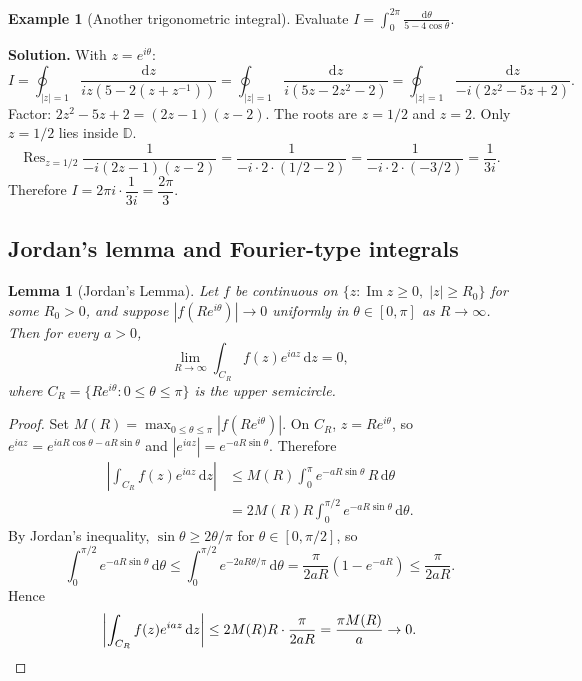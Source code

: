\documentclass[12pt,a4paper,openany]{book}
\theoremstyle{definition}
\newtheorem{example}[definition]{Example}
\theoremstyle{plain}
\newtheorem{lemma}[definition]{Lemma}
\theoremstyle{remark}
\newcommand{\D}{\mathbb{D}}
\DeclareMathOperator{\im}{Im}
\DeclareMathOperator{\Res}{Res}
\newcommand{\dd}{\mathrm{d}}
\newcommand{\abs}[1]{\left|#1\right|}
\begin{document}
\begin{example}[Another trigonometric integral]\label{ex:trig-2}
Evaluate $\displaystyle I=\int_0^{2\pi}\frac{\dd\theta}{5-4\cos\theta}$.

\medskip\noindent\textbf{Solution.}
With $z=e^{i\theta}$:
\[
  I=\oint_{\abs{z}=1}\frac{\dd z}{iz(5-2(z+z^{-1}))}
  =\oint_{\abs{z}=1}\frac{\dd z}{i(5z-2z^2-2)}
  =\oint_{\abs{z}=1}\frac{\dd z}{-i(2z^2-5z+2)}.
\]
Factor: $2z^2-5z+2=(2z-1)(z-2)$.  The roots are $z=1/2$ and $z=2$.
Only $z=1/2$ lies inside $\D$.
\[
  \Res_{z=1/2}\frac{1}{-i(2z-1)(z-2)}
  =\frac{1}{-i\cdot 2\cdot(1/2-2)}
  =\frac{1}{-i\cdot 2\cdot(-3/2)}
  =\frac{1}{3i}.
\]
Therefore $I=2\pi i\cdot\dfrac{1}{3i}=\dfrac{2\pi}{3}$.
\end{example}

\subsection{Jordan's lemma and Fourier-type integrals}
\label{ssec:jordan}

\begin{lemma}[Jordan's Lemma]\label{lem:jordan}
Let $f$ be continuous on $\{z:\im z\geq 0,\;\abs{z}\geq R_0\}$ for some
$R_0>0$, and suppose $\abs{f(Re^{i\theta})}\to 0$ uniformly in
$\theta\in[0,\pi]$ as $R\to\infty$.  Then for every $a>0$,
\[
  \lim_{R\to\infty}\int_{C_R}f(z)e^{iaz}\,\dd z=0,
\]
where $C_R=\{Re^{i\theta}:0\leq\theta\leq\pi\}$ is the upper semicircle.
\end{lemma}

\begin{proof}
Set $M(R)=\max_{0\leq\theta\leq\pi}\abs{f(Re^{i\theta})}$.  On $C_R$,
$z=Re^{i\theta}$, so $e^{iaz}=e^{iaR\cos\theta-aR\sin\theta}$ and
$\abs{e^{iaz}}=e^{-aR\sin\theta}$.  Therefore
\begin{align*}
  \left|\int_{C_R}f(z)e^{iaz}\,\dd z\right|
  &\leq M(R)\int_0^{\pi}e^{-aR\sin\theta}\,R\,\dd\theta \\
  &= 2M(R)R\int_0^{\pi/2}e^{-aR\sin\theta}\,\dd\theta.
\end{align*}
By Jordan's inequality, $\sin\theta\geq 2\theta/\pi$ for
$\theta\in[0,\pi/2]$, so
\[
  \int_0^{\pi/2}e^{-aR\sin\theta}\,\dd\theta
  \leq\int_0^{\pi/2}e^{-2aR\theta/\pi}\,\dd\theta
  =\frac{\pi}{2aR}(1-e^{-aR})\leq\frac{\pi}{2aR}.
\]
Hence
\[
  \left|\int_{C_R}f(z)e^{iaz}\,\dd z\right|
  \leq 2M(R)R\cdot\frac{\pi}{2aR}=\frac{\pi M(R)}{a}\to 0.
  \qedhere
\]
\end{proof}
\end{document}

